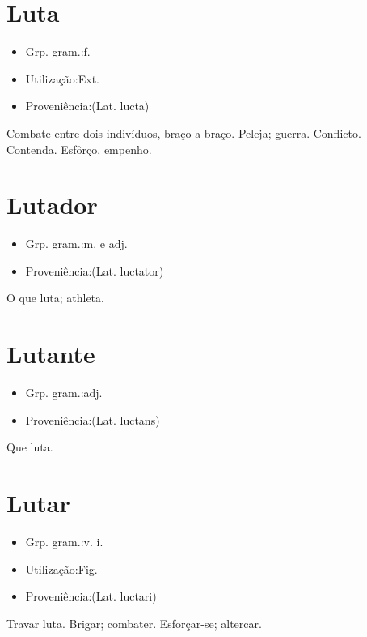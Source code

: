 \section{Luta}
\begin{itemize}
\item {Grp. gram.:f.}
\end{itemize}
\begin{itemize}
\item {Utilização:Ext.}
\end{itemize}
\begin{itemize}
\item {Proveniência:(Lat. \textunderscore lucta\textunderscore )}
\end{itemize}
Combate entre dois indivíduos, braço a braço.
Peleja; guerra.
Conflicto.
Contenda.
Esfôrço, empenho.
\section{Lutador}
\begin{itemize}
\item {Grp. gram.:m.  e  adj.}
\end{itemize}
\begin{itemize}
\item {Proveniência:(Lat. \textunderscore luctator\textunderscore )}
\end{itemize}
O que luta; athleta.
\section{Lutante}
\begin{itemize}
\item {Grp. gram.:adj.}
\end{itemize}
\begin{itemize}
\item {Proveniência:(Lat. \textunderscore luctans\textunderscore )}
\end{itemize}
Que luta.
\section{Lutar}
\begin{itemize}
\item {Grp. gram.:v. i.}
\end{itemize}
\begin{itemize}
\item {Utilização:Fig.}
\end{itemize}
\begin{itemize}
\item {Proveniência:(Lat. \textunderscore luctari\textunderscore )}
\end{itemize}
Travar luta.
Brigar; combater.
Esforçar-se; altercar.

